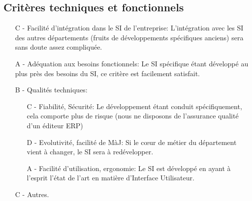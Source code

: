 \subsection{Critères techniques et fonctionnels}

\begin{itemize}
\item[C -] Facilité d'intégration dans le SI de l'entreprise:\el
L'intégration avec les SI des autres départements (fruits de développements
spécifiques anciens) sera sans doute assez compliquée.

\item[A -] Adéquation aux besoins fonctionnels:\el
Le SI spécifique étant développé au plus près des besoins du SI, ce critère
est facilement satisfait.

\item[B -] Qualités techniques:
\begin{itemize}

	\item[C -] Fiabilité, Sécurité:\el
Le développement étant conduit spécifiquement, cela comporte plus de risque
(nous ne disposons de l'assurance qualité d'un éditeur ERP)

	\item[D -] Evolutivité, facilité de MàJ:\el
Si le c\oe{}ur de métier du département vient à changer, le SI sera à
redévelopper.

	\item[A -] Facilité d'utilisation, ergonomie:\el
Le SI est développé en ayant à l'esprit l'état de l'art en matière
d'Interface Utilisateur.
\end{itemize}

\item[C -] Autres.
\end{itemize}

